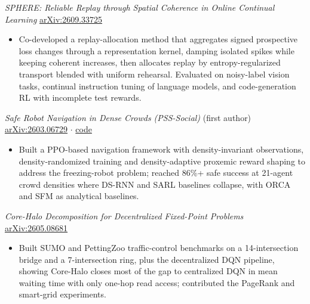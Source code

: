 \documentclass[11pt, letterpaper]{article}
\begin{document}
\textit{SPHERE: Reliable Replay through Spatial Coherence in Online Continual Learning} \hfill \href{https://arxiv.org/abs/2609.33725}{arXiv:2609.33725}
\begin{itemize}
    \item Co-developed a replay-allocation method that aggregates signed prospective loss changes through a representation kernel, damping isolated spikes while keeping coherent increases, then allocates replay by entropy-regularized transport blended with uniform rehearsal. Evaluated on noisy-label vision tasks, continual instruction tuning of language models, and code-generation RL with incomplete test rewards.
\end{itemize}
\textit{Safe Robot Navigation in Dense Crowds (PSS-Social)} (first author) \hfill \href{https://arxiv.org/abs/2603.06729}{arXiv:2603.06729} $\cdot$ \href{https://github.com/jefferyz001/PSS-Social}{code}
\begin{itemize}
    \item Built a PPO-based navigation framework with density-invariant observations, density-randomized training and density-adaptive proxemic reward shaping to address the freezing-robot problem; reached 86\%+ safe success at 21-agent crowd densities where DS-RNN and SARL baselines collapse, with ORCA and SFM as analytical baselines.
\end{itemize}
\textit{Core-Halo Decomposition for Decentralized Fixed-Point Problems} \hfill \href{https://arxiv.org/abs/2605.08681}{arXiv:2605.08681}
\begin{itemize}
    \item Built SUMO and PettingZoo traffic-control benchmarks on a 14-intersection bridge and a 7-intersection ring, plus the decentralized DQN pipeline, showing Core-Halo closes most of the gap to centralized DQN in mean waiting time with only one-hop read access; contributed the PageRank and smart-grid experiments.
\end{itemize}

\end{document}
